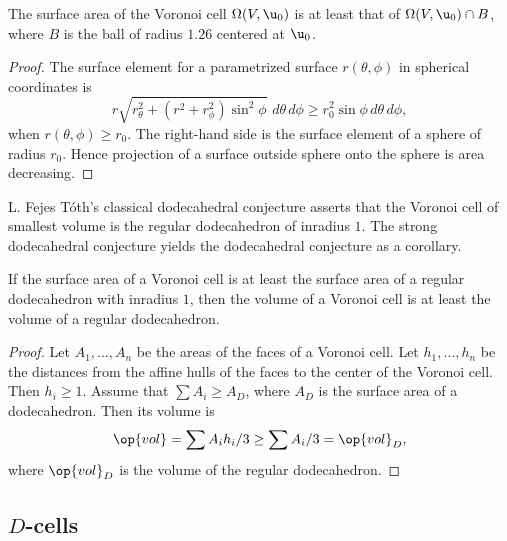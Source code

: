 \begin{lemma}[]  %
  The surface area of the Voronoi cell $\Omega(V, \u_0)$ is at least
  that of $\Omega(V, \u_0)\cap B$, where $B$ is the ball of radius
  $1.26$ centered at $ \u_0$.
\end{lemma}
%
%

\begin{proof} The surface element for a parametrized surface
  $r(\theta,\phi)$ in spherical coordinates is
\[
%
  r \sqrt{r_\theta^2 + (r^2 + r_\phi^2)\sin^2\phi } \,\,d\theta\,d\phi 
\ge r_0^2 \sin\phi\, d\theta\,d\phi,
\]
when $r(\theta,\phi)\ge r_0$.  The right-hand side is the surface
element of a sphere of radius $r_0$.  Hence projection of a surface
outside sphere onto the sphere is area decreasing.
\end{proof}


L. Fejes T\'oth's classical dodecahedral conjecture asserts that the
Voronoi cell of smallest volume is the regular dodecahedron of
inradius $1$.  %
%
The strong dodecahedral conjecture yields the dodecahedral conjecture
as a corollary.

\begin{lemma}[]
  If the surface area of a Voronoi cell is at least the surface area
  of a regular dodecahedron with inradius $1$, then the volume of a
  Voronoi cell is at least the volume of a regular dodecahedron.
\end{lemma}

\begin{proof} Let $A_1,\ldots,A_n$ be the areas of the faces of a
  Voronoi cell.  Let $h_1,\ldots,h_n$ be the distances from the affine
  hulls of the faces to the center of the Voronoi cell.  Then $h_i\ge
  1$.  Assume that $\sum A_i \ge A_D$, where $A_D$ is the surface area
  of a dodecahedron.  Then its volume is
\[
\op{vol} = \sum A_i h_i/3 \ge \sum A_i/3 = \op{vol}_D,
\]
where $\op{vol}_D$ is the volume of the regular dodecahedron.
\end{proof}
%
%
%


\subsection{$D$-cells}



